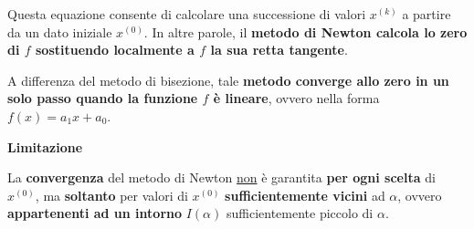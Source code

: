 \documentclass[a4paper]{article}
\newcommand{\highspace}{\vspace{1.2em}\noindent}
\begin{document}
    \highspace
    Questa equazione consente di calcolare una successione di valori $x^{(k)}$ a partire da un dato iniziale $x^{(0)}$. In altre parole, il \textbf{metodo di Newton calcola lo zero di $f$ sostituendo localmente a $f$ la sua retta tangente}.

    \highspace
    A differenza del metodo di bisezione, tale \textbf{metodo converge allo zero in un solo passo quando la funzione $f$ è lineare}, ovvero nella forma $f\left(x\right) = a_{1}x + a_{0}$.

    \begin{flushleft}
        \textcolor{Red2}{ \textbf{Limitazione}}
    \end{flushleft}
    La \textbf{convergenza} del metodo di Newton \underline{non} è garantita \textbf{per ogni scelta} di $x^{(0)}$, ma \textbf{soltanto} per valori di $x^{(0)}$ \textbf{sufficientemente vicini} ad $\alpha$, ovvero \textbf{appartenenti ad un intorno} $I\left(\alpha\right)$ sufficientemente piccolo di $\alpha$.
\end{document}
